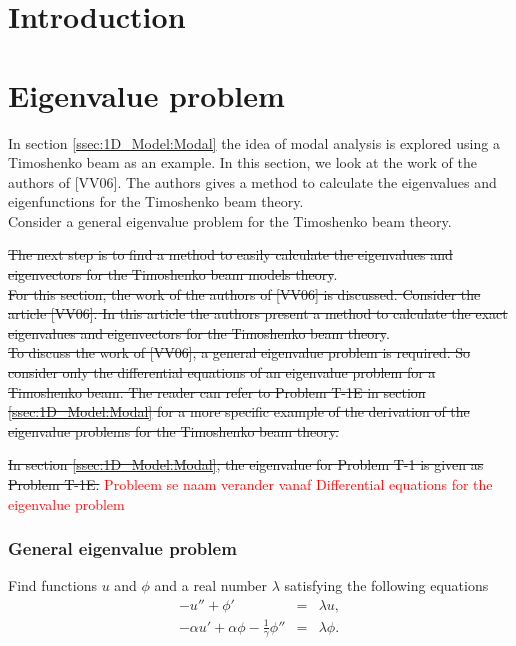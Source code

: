 \documentclass[../../main.tex]{subfiles}
\begin{document}
\section{Introduction}


\section{Eigenvalue problem}\label{sec:Timo:EigenvalueProblem}
In section \ref{ssec:1D_Model:Modal} the idea of modal analysis is explored using a Timoshenko beam as an example. In this section, we look at the work of the authors of [VV06]. The authors gives a method to calculate the eigenvalues and eigenfunctions for the Timoshenko beam theory.\\

Consider a general eigenvalue problem for the Timoshenko beam theory.

\sout{The next step is to find a method to {easily} calculate the eigenvalues and eigenvectors for the Timoshenko beam models {theory}}.\\

\sout{For this section, the work of the authors of [VV06] is discussed. {Consider the article [VV06].} In this article the authors present a method to calculate the exact eigenvalues and eigenvectors for the Timoshenko beam theory}.\\

\sout{To discuss the work of [VV06], a general eigenvalue problem is required. So consider only the differential equations of an eigenvalue problem for a Timoshenko beam. The reader can refer to Problem T-1E in section \ref{ssec:1D_Model:Modal} for a more specific example of the derivation of the eigenvalue problems for the Timoshenko beam theory.}

\sout{In section \ref{ssec:1D_Model:Modal}, the eigenvalue for Problem T-1 is given as Problem T-1E. }
\textcolor{red}{Probleem se naam verander vanaf Differential equations for the eigenvalue problem}
\subsubsection{General eigenvalue problem} \label{sssec:Timo:EigenvalueProblem}
Find functions $u$ and $\phi$ and a real number $\lambda$ satisfying the following equations
\begin{eqnarray}
-u'' + \phi' &=& \lambda u, \label{eq:Timo:EigenvalueProblem1}\\
-\alpha u' + \alpha\phi - \frac{1}{\gamma}\phi'' &=& \lambda\phi.\label{eq:Timo:EigenvalueProblem2}
\end{eqnarray}
\end{document}

